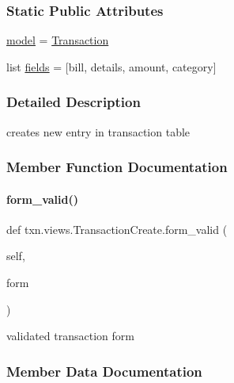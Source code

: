 \subsubsection*{Static Public Attributes}
\begin{DoxyCompactItemize}
\item 
\hyperlink{classtxn_1_1views_1_1TransactionCreate_af71d5d75fe4be1c099db6115eb3a3b49}{model} = \hyperlink{classtxn_1_1models_1_1Transaction}{Transaction}
\item 
list \hyperlink{classtxn_1_1views_1_1TransactionCreate_a806c267ac71806148a8466cba0afbcc8}{fields} = \mbox{[}\textquotesingle{}bill\textquotesingle{}, \textquotesingle{}details\textquotesingle{}, \textquotesingle{}amount\textquotesingle{}, \textquotesingle{}category\textquotesingle{}\mbox{]}
\end{DoxyCompactItemize}


\subsubsection{Detailed Description}
creates new entry in transaction table 

\subsubsection{Member Function Documentation}
\mbox{\label{classtxn_1_1views_1_1TransactionCreate_a2af449f7a40ff78175b57ce079eb6e11}} 
\paragraph{\texorpdfstring{form\+\_\+valid()}{form\_valid()}}
{\footnotesize\ttfamily def txn.\+views.\+Transaction\+Create.\+form\+\_\+valid (\begin{DoxyParamCaption}\item[{}]{self,  }\item[{}]{form }\end{DoxyParamCaption})}



validated transaction form 



\subsubsection{Member Data Documentation}
\mbox{\label{classtxn_1_1views_1_1TransactionCreate_a806c267ac71806148a8466cba0afbcc8}} 

